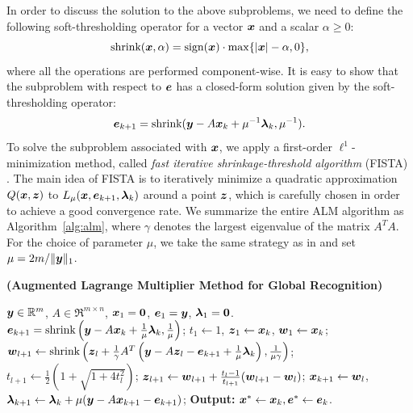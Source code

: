 \documentclass[12pt,journal,draftcls,letterpaper,onecolumn]{IEEEtran}
\begin{document}
In order to discuss the solution to the above subproblems, we
need to define the following soft-thresholding operator for a
vector ${\boldsymbol{x}}$ and a scalar $\alpha \geq 0$:
\begin{equation}
\textup{shrink}({\boldsymbol{x}},\alpha) = \textup{sign}({\boldsymbol{x}})\cdot \max \{|{\boldsymbol{x}}| - \alpha, 0\},
\end{equation}
where all the operations are performed component-wise. It is
easy to show that the subproblem with respect to $\boldsymbol{e}$ has a
closed-form solution given by the soft-thresholding operator:
\begin{equation}
\boldsymbol{e}_{k+1} = \textup{shrink}({\boldsymbol{y}} - A{\boldsymbol{x}}_k + \mu^{-1}\boldsymbol{\lambda}_k, \mu^{-1}).
\end{equation}
To solve the subproblem associated with ${\boldsymbol{x}}$, we
apply a first-order $\ell^1$-minimization method,
called \emph{fast iterative shrinkage-threshold algorithm}
(FISTA) \cite{BeckA2009}. The main idea of FISTA is to
iteratively minimize a quadratic approximation $Q({\boldsymbol{x}}, \boldsymbol{z})$ to
$L_{\mu} ({\boldsymbol{x}},\boldsymbol{e}_{k+1},\boldsymbol{\lambda}_k)$ around a point $\boldsymbol{z}$, which is
carefully chosen in order to achieve a good convergence
rate. We summarize the entire ALM
algorithm as Algorithm~\ref{alg:alm}, where $\gamma$ denotes the
largest eigenvalue of the matrix $A^TA$. For the choice of parameter $\mu$, we take the same strategy as
in \cite{YangJ2009-pp} and set $\mu = 2m / \|{\boldsymbol{y}}\|_1$.
\begin{algorithm}[t]
\caption{\bf (Augmented Lagrange Multiplier Method for Global
Recognition)}
\begin{algorithmic}[1]
\begin{small}
 ${\boldsymbol{y}} \in \mathbb R^m$, $A \in \Re^{m \times n}$,
${\boldsymbol{x}}_1 = \boldsymbol{0}$, $\boldsymbol{e}_1 = {\boldsymbol{y}}$, $\boldsymbol{\lambda}_1 =
\boldsymbol{0}$.
\STATE $\boldsymbol{e}_{k+1} = \textup{shrink}\left({\boldsymbol{y}} - A{\boldsymbol{x}}_k +
\frac{1}{\mu}\boldsymbol{\lambda}_k, \frac{1}{\mu}\right)$;
\STATE $t_1\leftarrow 1$, $\boldsymbol{z}_1 \leftarrow {\boldsymbol{x}}_k$, $\boldsymbol{w}_1 \leftarrow {\boldsymbol{x}}_k$;
\STATE $\boldsymbol{w}_{l+1} \leftarrow \textup{shrink}\left(\boldsymbol{z}_l +
\frac{1}{\gamma}A^T\left({\boldsymbol{y}} - A\boldsymbol{z}_l - \boldsymbol{e}_{k+1} +
\frac{1}{\mu}\boldsymbol{\lambda}_k\right), \frac{1}{\mu\gamma}\right)$;
\STATE $t_{l+1} \leftarrow \frac{1}{2}\left( 1 +
\sqrt{1+4t_l^2}\right)$;
\STATE $\boldsymbol{z}_{l+1} \leftarrow \boldsymbol{w}_{l+1} + \frac{t_l - 1}{t_{l+1}}(\boldsymbol{w}_{l+1} - \boldsymbol{w}_l)$;
\ENDWHILE
\STATE ${\boldsymbol{x}}_{k+1} \leftarrow \boldsymbol{w}_{l}$,  \; $\boldsymbol{\lambda}_{k+1} \leftarrow \boldsymbol{\lambda}_k + \mu ({\boldsymbol{y}} - A{\boldsymbol{x}}_{k+1} - \boldsymbol{e}_{k+1})$;
\ENDWHILE \STATE
{\bf Output:} ${\boldsymbol{x}}^* \leftarrow {\boldsymbol{x}}_k, \boldsymbol{e}^* \leftarrow \boldsymbol{e}_k$.
\end{small}
\end{algorithmic}
\label{alg:alm} 
\end{algorithm}
\end{document}
